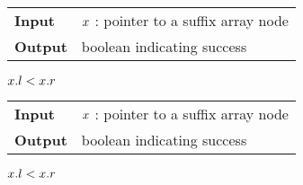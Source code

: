 \begin{figure*}
\begin{minipage}[t]{.5\textwidth}
\begin{algorithm}[H]
\label{alg:sa-godown}
\begin{tabular}{ll}
\textbf{Input}  & $x$ : pointer to a suffix array node\\
\textbf{Output} & boolean indicating success\\
\end{tabular}
\begin{algorithmic}[1]
	\State \Return \False
\EndIf
{}
{}
\EndIf
\State \Return $x.l < x.r$
\end{algorithmic}
\end{algorithm}
\end{minipage}
\hfill
\begin{minipage}[t]{.5\textwidth}
\begin{algorithm}[H]
\label{alg:sa-goright}
\begin{tabular}{ll}
\textbf{Input}  & $x$ : pointer to a suffix array node\\
\textbf{Output} & boolean indicating success\\
\end{tabular}
\begin{algorithmic}[1]
	\State \Return \False
\EndIf
{}
\EndIf
\State \Return $x.l < x.r$
\end{algorithmic}
\end{algorithm}
\end{minipage}
\end{figure*}

